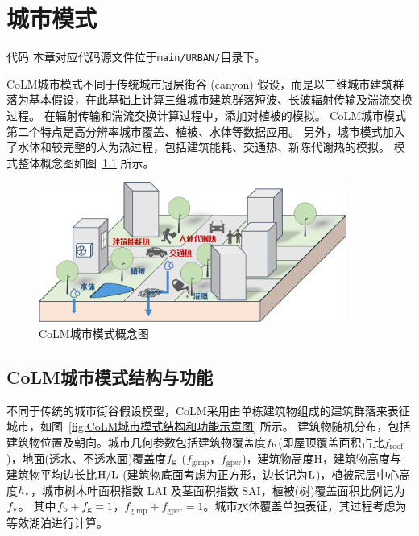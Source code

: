 \chapter{城市模式}\label{城市模式}
\begin{mymdframed}{代码}
  本章对应代码源文件位于\texttt{main/URBAN/}目录下。
\end{mymdframed}

CoLM城市模式不同于传统城市冠层街谷 (canyon) 假设，而是以三维城市建筑群落为基本假设，在此基础上计算三维城市建筑群落短波、长波辐射传输及湍流交换过程。
在辐射传输和湍流交换计算过程中，添加对植被的模拟。
CoLM城市模式第二个特点是高分辨率城市覆盖、植被、水体等数据应用。
另外，城市模式加入了水体和较完整的人为热过程，包括建筑能耗、交通热、新陈代谢热的模拟。
模式整体概念图如图~\ref{fig:CoLM城市模式概念图} 所示。
\newline
{
  \begin{figure}[htbp]
    \centering
    \includegraphics[width=0.9\textwidth]{Figures/城市模式/CoLM城市模式概念图.png}
    \caption{CoLM城市模式概念图}
    \label{fig:CoLM城市模式概念图}
  \end{figure}
}

\section{CoLM城市模式结构与功能}
不同于传统的城市街谷假设模型，CoLM采用由单栋建筑物组成的建筑群落来表征城市，如图~\ref{fig:CoLM城市模式结构和功能示意图} 所示。
建筑物随机分布，包括建筑物位置及朝向。城市几何参数包括建筑物覆盖度$f_{\rm b}$(即屋顶覆盖面积占比$f_{\mathrm{roof}}$)，地面(透水、不透水面)覆盖度$f_{\rm g}$ ($f_{\mathrm{gimp}}$，$f_{\mathrm{gper}}$)，建筑物高度${\mathrm {H}}$，建筑物高度与建筑物平均边长比$\rm H/L$ (建筑物底面考虑为正方形，边长记为$\rm L$)，植被冠层中心高度$h_{\rm v}$，城市树木叶面积指数 LAI 及茎面积指数 SAI，植被(树)覆盖面积比例记为$f_{\rm v}$。
其中$f_{\rm b}+f_{\rm g}=1$，$f_{\mathrm{gimp}}+f_{\mathrm{gper}}=1$。城市水体覆盖单独表征，其过程考虑为等效湖泊进行计算。

